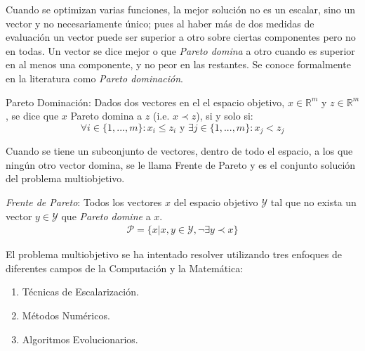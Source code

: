 Cuando se optimizan varias funciones, la mejor soluci\'on  no es un escalar, sino un vector y no necesariamente \'unico; pues al haber m\'as de dos medidas de evaluaci\'on un vector puede ser superior a otro sobre ciertas componentes pero no en todas. Un vector se dice mejor o que \textit{Pareto domina} a otro cuando es superior en al menos una componente, y no peor en las restantes. Se conoce formalmente en la literatura como \textit{Pareto dominaci\'on}.
\begin{definition}{Pareto Dominaci\'on:}
    \label{background:def:domintation}
    Dados dos vectores en el el espacio objetivo, $x \in \mathbb{R}^m$ y $z \in \mathbb{R}^m$, se dice que $x$ Pareto domina a $z$ (i.e. $x \prec z$), si y solo si:
    \begin{equation*}
        \forall i \in \{1, ..., m\}: x_i \leq z_i \text{ y } \exists j \in \{1, ..., m\}: x_j < z_j
    \end{equation*}
\end{definition}

Cuando se tiene un subconjunto de vectores, dentro de todo el espacio,  a los que ning\'un otro vector domina, se le  llama Frente de Pareto y es el conjunto soluci\'on del problema multiobjetivo.

\begin{definition}
    \label{background:def:pareto_front}
    \textit{Frente de Pareto}: Todos los vectores $x$ del espacio objetivo $\mathcal{Y}$ tal que no exista un vector $y \in \mathcal{Y}$ que \textit{Pareto domine} a $x$.
    \begin{align*}
        \mathcal{P} = \{x| x, y \in \mathcal{Y}, \neg \exists y \prec x \} 
    \end{align*}
\end{definition}



El problema multiobjetivo se ha intentado resolver utilizando tres enfoques de diferentes campos de la Computaci\'on y la Matem\'atica:
\begin{enumerate}
    \item T\'ecnicas de Escalarizaci\'on.
    \item M\'etodos Num\'ericos.
    \item Algoritmos Evolucionarios.
\end{enumerate}



